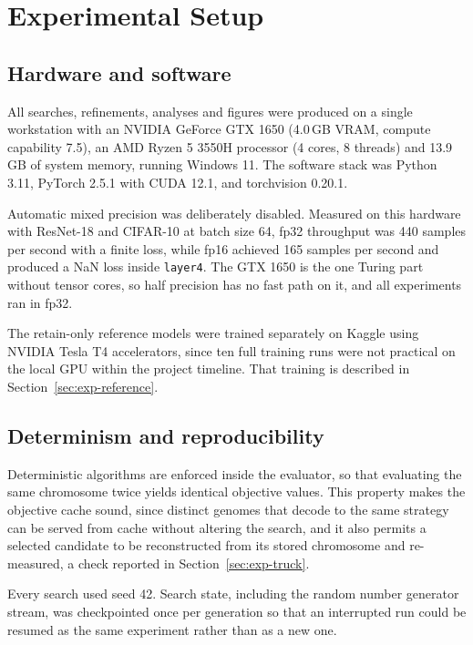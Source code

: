 \section{Experimental Setup}
\label{sec:exp-setup}

\subsection{Hardware and software}

All searches, refinements, analyses and figures were produced on a single
workstation with an NVIDIA GeForce GTX 1650 (4.0\,GB VRAM, compute capability
7.5), an AMD Ryzen 5 3550H processor (4 cores, 8 threads) and 13.9\,GB of system
memory, running Windows 11. The software stack was Python 3.11, PyTorch 2.5.1
with CUDA 12.1, and torchvision 0.20.1.

Automatic mixed precision was deliberately disabled. Measured on this hardware
with ResNet-18 and CIFAR-10 at batch size 64, fp32 throughput was 440 samples per
second with a finite loss, while fp16 achieved 165 samples per second and produced
a NaN loss inside \texttt{layer4}. The GTX 1650 is the one Turing part without
tensor cores, so half precision has no fast path on it, and all experiments ran in
fp32.

The retain-only reference models were trained separately on Kaggle using NVIDIA
Tesla T4 accelerators, since ten full training runs were not practical on the
local GPU within the project timeline. That training is described in
Section~\ref{sec:exp-reference}.

\subsection{Determinism and reproducibility}

Deterministic algorithms are enforced inside the evaluator, so that evaluating
the same chromosome twice yields identical objective values. This property makes
the objective cache sound, since distinct genomes that decode to the same strategy
can be served from cache without altering the search, and it also permits a
selected candidate to be reconstructed from its stored chromosome and re-measured,
a check reported in Section~\ref{sec:exp-truck}.

Every search used seed 42. Search state, including the random number generator
stream, was checkpointed once per generation so that an interrupted run could be
resumed as the same experiment rather than as a new one.

